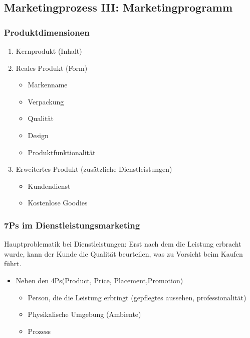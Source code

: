 
\subsection{Marketingprozess III: Marketingprogramm }

\subsubsection{Produktdimensionen}
\begin{enumerate}
    \item Kernprodukt (Inhalt)
    \item Reales Produkt (Form)
    \begin{itemize}
        \item Markenname
        \item Verpackung
        \item Qualität
        \item Design
        \item Produktfunktionalität
    \end{itemize}
    \item Erweitertes Produkt (zusätzliche Dienstleistungen)
    \begin{itemize}
        \item Kundendienst
        \item Kostenlose Goodies
    \end{itemize}
\end{enumerate}
\subsubsection{7Ps im Dienstleistungsmarketing}
Hauptproblematik bei Dienstleistungen: Erst nach dem die Leistung erbracht wurde, kann der Kunde die Qualität beurteilen, was zu Vorsicht beim Kaufen führt.
\begin{itemize}
    \item Neben den 4Ps(Product, Price, Placement,Promotion)
    \begin{itemize}
        \item Person, die die Leistung erbringt (gepflegtes aussehen, professionalität)
        \item Physikalische Umgebung (Ambiente)
        \item Prozess 
    \end{itemize}
\end{itemize}
